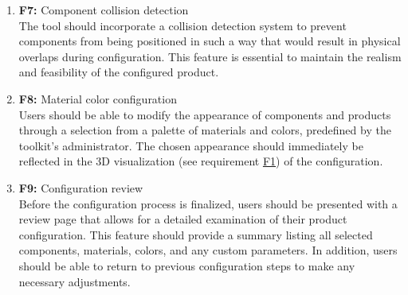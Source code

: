 \begin{enumerate}
\item \textbf{F7:} \label{itm:F7} Component collision detection
\vspace{2pt}
\\The tool should incorporate a collision detection system to prevent components from being positioned in such a way that would result in physical overlaps during configuration. This feature is essential to maintain the realism and feasibility of the configured product.
\vspace{4pt}

\item \textbf{F8:} \label{itm:F8} Material color configuration
\vspace{2pt}
\\Users should be able to modify the appearance of components and products through a selection from a palette of materials and colors, predefined by the toolkit's administrator. The chosen appearance should immediately be reflected in the 3D visualization (see requirement \hyperref[itm:F1]{F1}) of the configuration.
\vspace{4pt}

\item \textbf{F9:} \label{itm:F9} Configuration review
\vspace{2pt}
\\Before the configuration process is finalized, users should be presented with a review page that allows for a detailed examination of their product configuration. This feature should provide a summary listing all selected components, materials, colors, and any custom parameters. In addition, users should be able to return to previous configuration steps to make any necessary adjustments.
\vspace{4pt}


\end{enumerate}
